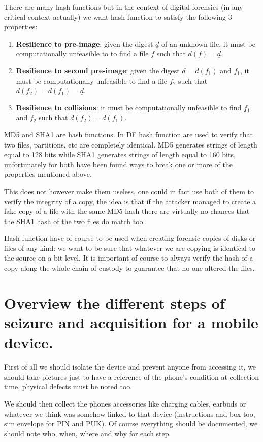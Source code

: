 \documentclass[a4paper, 12pt]{article}
\begin{document}
There are many hash functions but in the context of digital forensics (in any critical context actually) we want hash function to satisfy the following 3 properties:
\begin{enumerate}
    \item \textbf{Resilience to pre-image}: given the digest $\underline{d}$ of an unknown file, it must be computationally unfeasible to to find a file $f$ such that $d(f) = \underline{d}$.
    \item \textbf{Resilience to second pre-image}: given the digest $\underline{d} = d(f_1)$ and $f_1$, it must be computationally unfeasible to find a file $f_2$ such that $d(f_2) = d(f_1) = \underline{d}$.
    \item \textbf{Resilience to collisions}: it must be computationally unfeasible to find $f_1$ and $f_2$ such that $d(f_2) = d(f_1)$.
\end{enumerate}

MD5 and SHA1 are hash functions. In DF hash function are used to verify that two
files, partitions, etc are completely identical. MD5 generates strings of length equal to 128 bits while SHA1 generates strings of length equal to 160 bits, unfortunately for both have been found ways to break one or more of the properties mentioned above.

This does not however make them useless, one could in fact use both of them to verify the integrity of a copy, the idea is that if the attacker managed to create a fake copy of a file with the same MD5 hash there are virtually no chances that the SHA1 hash of the two files do match too.

Hash function have of course to be used when creating forensic copies of disks or files of any kind: we want to be sure that whatever we are copying is identical to the source on a bit level. It is important of course to always verify the hash of a copy along the whole chain of custody to guarantee that no one altered the files.

\section{Overview the different steps of seizure and acquisition for a mobile device.}

First of all we should isolate the device and prevent anyone from accessing it, we should take pictures just to have a reference of the phone's condition at collection time, physical defects must be noted too.

We should then collect the phones accessories like charging cables, earbuds or whatever we think was somehow linked to that device (instructions and box too, sim envelope for PIN and PUK). Of course everything should be documented, we should note who, when, where and why for each step.
\end{document}
